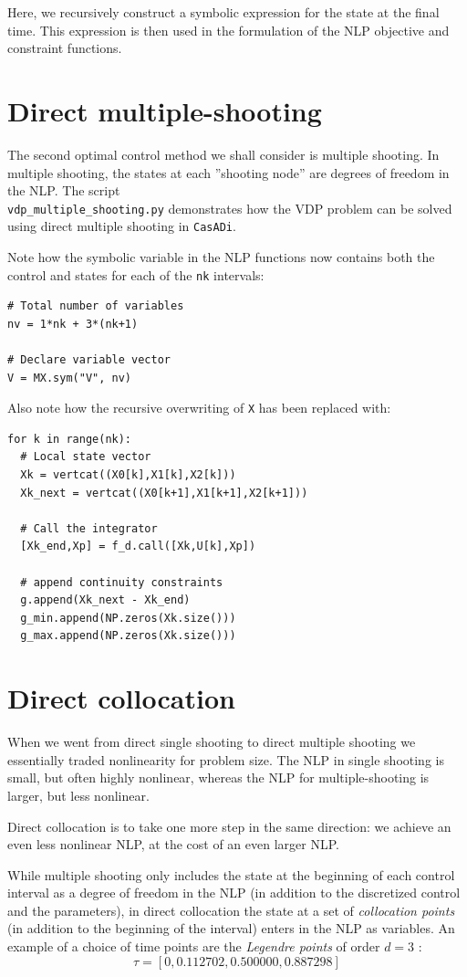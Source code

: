 \documentclass[a4paper,12pt]{book}
\newcommand{\CasADi}{\texttt{CasADi}\xspace}
\begin{document}
Here, we recursively construct a symbolic expression for the state at the final time. This expression is then used in the formulation of the NLP objective and constraint functions.

\section{Direct multiple-shooting}
The second optimal control method we shall consider is multiple shooting. In multiple shooting, the states at each ''shooting node'' are degrees of freedom in the NLP. The script \\ \texttt{vdp\_multiple\_shooting.py} demonstrates how the VDP problem can be solved using direct multiple shooting in \CasADi.

Note how the symbolic variable in the NLP functions now contains both the control and states for each of the \texttt{nk} intervals:
\begin{verbatim}
# Total number of variables
nv = 1*nk + 3*(nk+1)

# Declare variable vector
V = MX.sym("V", nv)
\end{verbatim}

Also note how the recursive overwriting of \texttt{X} has been replaced with:
\begin{verbatim}
for k in range(nk):
  # Local state vector
  Xk = vertcat((X0[k],X1[k],X2[k]))
  Xk_next = vertcat((X0[k+1],X1[k+1],X2[k+1]))
  
  # Call the integrator
  [Xk_end,Xp] = f_d.call([Xk,U[k],Xp])
  
  # append continuity constraints
  g.append(Xk_next - Xk_end)
  g_min.append(NP.zeros(Xk.size()))
  g_max.append(NP.zeros(Xk.size()))
\end{verbatim}

\section{Direct collocation}
When we went from direct single shooting to direct multiple shooting we essentially traded nonlinearity for problem size. The NLP in single shooting is small, but often highly nonlinear, whereas the NLP for multiple-shooting is larger, but less nonlinear.

Direct collocation is to take one more step in the same direction: we achieve an even less nonlinear NLP, at the cost of an even larger NLP.

While multiple shooting only includes the state at the beginning of each control interval as a degree of freedom in the NLP (in addition to the discretized control and the parameters), in direct collocation the state at a set of \emph{collocation points} (in addition to the beginning of the interval) enters in the NLP as variables. An example of a choice of time points are the \emph{Legendre points} of order $d=3$ :
\begin{equation}
 \tau = [0,0.112702,0.500000,0.887298]
\end{equation}
\end{document}
